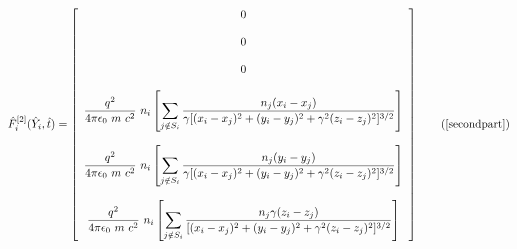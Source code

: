 \documentclass[oneside,12pt]{book}
\begin{document}
\begin{equation}
\hat{F}^{[2]}_i(\hat{Y}_i,\hat{t})=\left[
\begin{array}{c}
0
\\
\\
0
\\
\\
0
\\
\\
\dfrac{q^2}{4 \pi \epsilon_0 \ m \ c^2} \ n_i\left[
\displaystyle\sum\limits_{j \notin S_i}
 \dfrac{n_j (x_i-x_j)}{\gamma[(x_i-x_j)^2+(y_i-y_j)^2+\gamma^2(z_i-z_j)^2]^{3 \slash 2}}\right]
\\
\\
\dfrac{q^2}{4 \pi \epsilon_0 \ m \ c^2} \ n_i\left[
\displaystyle\sum\limits_{j \notin S_i}
 \dfrac{n_j (y_i-y_j)}{\gamma[(x_i-x_j)^2+(y_i-y_j)^2+\gamma^2(z_i-z_j)^2]^{3 \slash 2}}\right]
\\
\\
\dfrac{q^2}{4 \pi \epsilon_0 \ m \ c^2} \ n_i\left[
\displaystyle\sum\limits_{j \notin S_i}
 \dfrac{n_j \gamma(z_i-z_j)}{[(x_i-x_j)^2+(y_i-y_j)^2+\gamma^2(z_i-z_j)^2]^{3 \slash 2}}\right]
\end{array}
\right]
\tag{\ref{secondpart}}
\end{equation}
\end{document}
